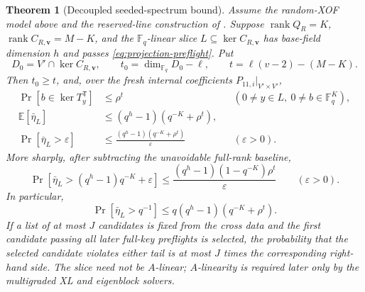 \documentclass[11pt]{article}
\newtheorem{theorem}{Theorem}
\newcommand{\F}{\mathbb F}
\newcommand{\rank}{\operatorname{rank}}
\newcommand{\transpose}{\mathsf T}
\begin{document}
\begin{theorem}[Decoupled seeded-spectrum bound]\label{thm:seeded-spectrum}
Assume the random-XOF model above and the reserved-line construction of
.  Suppose
$\rank Q_R=K$, $\rank C_{R,\mathbf v}=M-K$, and the
$\F_q$-linear slice $L\subseteq\ker C_{R,\mathbf v}$ has base-field dimension
$h$ and passes \eqref{eq:projection-preflight}.  Put
\begin{equation}\label{eq:seeded-D0-t}
 D_0=V'\cap\ker C_{R,\mathbf v},
 \qquad
 t_0=\dim_{\F_q}D_0-\ell,
 \qquad
 t=\ell(v-2)-(M-K).
\end{equation}
Then $t_0\ge t$, and, over the fresh internal coefficients
$P_{11,i}|_{V'\times V'}$,
\begin{align}
 \Pr[b\in\ker T_y^\transpose]&\le\rho^t
 &&(0\ne y\in L,\ 0\ne b\in\F_q^K),
 \label{eq:seeded-direction-output}\\
 \mathbb E[\bar\eta_L]
 &\le(q^h-1)(q^{-K}+\rho^t),
 \label{eq:seeded-eta-mean}\\
 \Pr[\bar\eta_L>\varepsilon]
 &\le\frac{(q^h-1)(q^{-K}+\rho^t)}{\varepsilon}
 &&(\varepsilon>0).
 \label{eq:seeded-eta-tail}
\end{align}
More sharply, after subtracting the unavoidable full-rank baseline,
\begin{equation}\label{eq:seeded-excess-tail}
 \Pr\!\left[\bar\eta_L>(q^h-1)q^{-K}+\varepsilon\right]
 \le\frac{(q^h-1)(1-q^{-K})\rho^t}{\varepsilon}
 \qquad(\varepsilon>0).
\end{equation}
In particular,
\begin{equation}\label{eq:seeded-headline-tail}
 \Pr[\bar\eta_L>q^{-1}]
 \le q(q^h-1)(q^{-K}+\rho^t).
\end{equation}
If a list of at most $J$ candidates is fixed from the cross data and the first
candidate passing all later full-key preflights is selected, the probability
that the selected candidate violates either tail is at most $J$ times the
corresponding right-hand side.  The slice need not be $A$-linear;
$A$-linearity is required later only by the multigraded XL and eigenblock
solvers.
\end{theorem}
\end{document}
